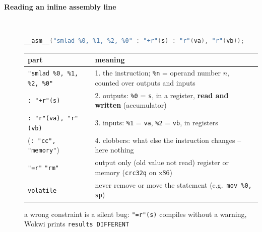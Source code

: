 \begin{description}
\item[{\rot\bf Reading an inline assembly line}]~\\[-\lstskip]
\begin{lstlisting}[language=C]
__asm__("smlad %0, %1, %2, %0" : "+r"(s) : "r"(va), "r"(vb));
\end{lstlisting}
\begin{center}
\end{center}
{\small%
\begin{tabularx}{\linewidth}{|>{\raggedright}p{64mm}|L|}
\hline
\textbf{part} & \textbf{meaning} \\
\hline
\texttt{"smlad \%0, \%1, \%2, \%0"} & 1. the instruction; \texttt{\%n} = operand number $n$, counted over outputs and inputs \\
\texttt{: "+r"(s)} & 2. outputs: \texttt{\%0} = \texttt{s}, in a register, \textbf{read and written} (accumulator) \\
\texttt{: "r"(va), "r"(vb)} & 3. inputs: \texttt{\%1} = \texttt{va}, \texttt{\%2} = \texttt{vb}, in registers \\
(\texttt{: "cc", "memory"}) & 4. clobbers: what else the instruction changes -- here nothing \\
\hline
\texttt{"=r"} \quad \texttt{"rm"} & output only (old value not read) \quad register or memory (\texttt{crc32q} on x86) \\
\texttt{volatile} & never remove or move the statement (e.g.\ \texttt{mov \%0, sp}) \\
\hline
\end{tabularx}}
\bi
	\ite a wrong constraint is a silent bug: \texttt{"=r"(s)} compiles without a warning, Wokwi prints \texttt{results DIFFERENT}
\ei
\os{\newpage}


\end{description}
